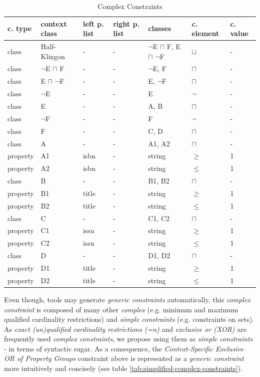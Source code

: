 \documentclass{llncs}
\begin{document}
\begin{table}
  \scriptsize
  \sffamily
  \vspace{0cm}
	\centering
		\begin{tabular}{l|l|l|l|l|l|l}
      \textbf{c. type} & \textbf{context class} & \textbf{left p. list} & \textbf{right p. list} & \textbf{classes} & \textbf{c. element} & \textbf{c. value} \\
      \hline
class & Half-Klingon & - & - & $\neg$E $\sqcap$ F, E $\sqcap$ $\neg$F & $\sqcup$ & - \\
class & $\neg$E $\sqcap$ F & - & - & $\neg$E, F & $\sqcap$ & - \\
class & E $\sqcap$ $\neg$F & - & - & E, $\neg$F & $\sqcap$ & - \\
class & $\neg$E & - & - & E & $\neg$ & - \\
class & E & - & - & A, B & $\sqcap$ & - \\
class & $\neg$F & - & - & F & $\neg$ & - \\
class & F & - & - & C, D & $\sqcap$ & - \\
class & A & - & - & A1, A2 & $\sqcap$ & - \\
property & A1 & isbn & - & string & $\geq$ & 1 \\
property & A2 & isbn & - & string & $\leq$ & 1 \\
class & B & - & - & B1, B2 & $\sqcap$ & - \\
property & B1 & title & - & string & $\geq$ & 1 \\
property & B2 & title & - & string & $\leq$ & 1 \\
class & C & - & - & C1, C2 & $\sqcap$ & - \\
property & C1 & issn & - & string & $\geq$ & 1 \\
property & C2 & issn & - & string & $\leq$ & 1 \\
class & D & - & - & D1, D2 & $\sqcap$ & - \\
property & D1 & title & - & string & $\geq$ & 1 \\
property & D2 & title & - & string & $\leq$ & 1 \\
		\end{tabular}
	\caption{Complex Constraints}
	\label{tab:complex-constraints}
\end{table}

Even though, tools may generate \emph{generic constraints} automatically, this \emph{complex constraint} is composed of many other \emph{complex} (e.g. minimum and maximum qualified cardinality restrictions) and \emph{simple constraints} (e.g. constraints on sets).
As \emph{exact (un)qualified cardinality restrictions (=n)} and \emph{exclusive or (XOR)} are frequently used \emph{complex constraints},
we propose using them as \emph{simple constraints} - in terms of syntactic sugar.
As a consequence, the \emph{Context-Specific Exclusive OR of Property Groups} constraint above is represented as a \emph{generic constraint} more intuitively and concisely (see table \ref{tab:simplified-complex-constraints}).
\end{document}
